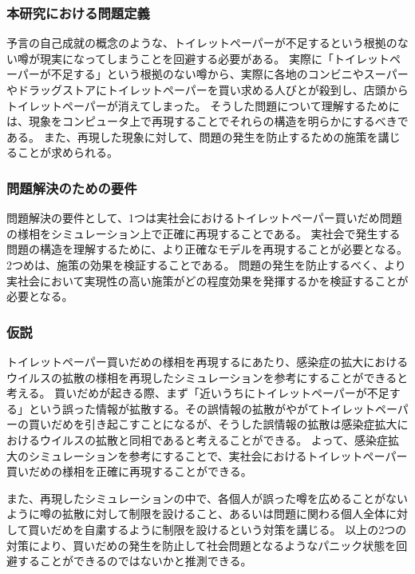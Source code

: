\subsubsection{本研究における問題定義}
予言の自己成就の概念のような、トイレットペーパーが不足するという根拠のない噂が現実になってしまうことを回避する必要がある。
実際に「トイレットペーパーが不足する」という根拠のない噂から、実際に各地のコンビニやスーパーやドラッグストアにトイレットペーパーを買い求める人びとが殺到し、店頭からトイレットペーパーが消えてしまった。
そうした問題について理解するためには、現象をコンピュータ上で再現することでそれらの構造を明らかにするべきである。
また、再現した現象に対して、問題の発生を防止するための施策を講じることが求められる。

\subsubsection{問題解決のための要件}
問題解決の要件として、1つは実社会におけるトイレットペーパー買いだめ問題の様相をシミュレーション上で正確に再現することである。
実社会で発生する問題の構造を理解するために、より正確なモデルを再現することが必要となる。
2つめは、施策の効果を検証することである。
問題の発生を防止するべく、より実社会において実現性の高い施策がどの程度効果を発揮するかを検証することが必要となる。

\subsubsection{仮説}
トイレットペーパー買いだめの様相を再現するにあたり、感染症の拡大におけるウイルスの拡散の様相を再現したシミュレーションを参考にすることができると考える。
買いだめが起きる際、まず「近いうちにトイレットペーパーが不足する」という誤った情報が拡散する。その誤情報の拡散がやがてトイレットペーパーの買いだめを引き起こすことになるが、そうした誤情報の拡散は感染症拡大におけるウイルスの拡散と同相であると考えることができる。
よって、感染症拡大のシミュレーションを参考にすることで、実社会におけるトイレットペーパー買いだめの様相を正確に再現することができる。

また、再現したシミュレーションの中で、各個人が誤った噂を広めることがないように噂の拡散に対して制限を設けること、あるいは問題に関わる個人全体に対して買いだめを自粛するように制限を設けるという対策を講じる。
以上の2つの対策により、買いだめの発生を防止して社会問題となるようなパニック状態を回避することができるのではないかと推測できる。


